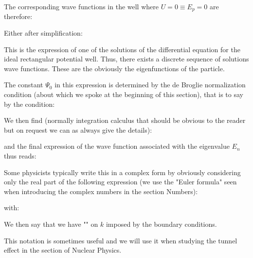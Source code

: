 	The corresponding wave functions in the well where $U=0 \equiv E_p=0$ are therefore:
	
	Either after simplification:
	
	This is the expression of one of the solutions of the differential equation for the ideal rectangular potential well. Thus, there exists a discrete sequence of solutions wave functions. These are the obviously the eigenfunctions of the particle.

	The constant $\Psi_0$ in this expression is determined by the de Broglie normalization  condition (about which we spoke at the beginning of this section), that is to say by the condition:
	
	We then find (normally integration calculus that should be obvious to the reader but on request we can as always give the details):
	
	and the final expression of the wave function associated with the eigenvalue $E_n$ thus reads:
	
	Some physicists typically write this in a complex form by obviously considering only the real part of the following expression (we use the "Euler formula" seen when introducing the complex numbers in the section Numbers):
	
	with:
	
	We then say that we have "" on $k$ imposed by the boundary conditions.

	This notation is sometimes useful and we will use it when studying the tunnel effect in the section of Nuclear Physics.

